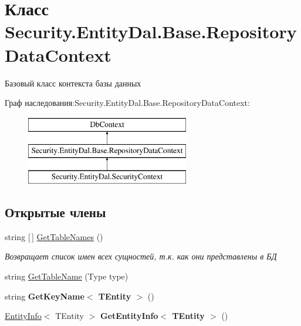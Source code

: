 \hypertarget{class_security_1_1_entity_dal_1_1_base_1_1_repository_data_context}{}\section{Класс Security.\+Entity\+Dal.\+Base.\+Repository\+Data\+Context}
\label{class_security_1_1_entity_dal_1_1_base_1_1_repository_data_context}


Базовый класс контекста базы данных  


Граф наследования\+:Security.\+Entity\+Dal.\+Base.\+Repository\+Data\+Context\+:\begin{figure}[H]
\begin{center}
\leavevmode
\includegraphics[height=3.000000cm]{d9/d5a/class_security_1_1_entity_dal_1_1_base_1_1_repository_data_context}
\end{center}
\end{figure}
\subsection*{Открытые члены}
\begin{DoxyCompactItemize}
\item 
string \mbox{[}$\,$\mbox{]} \hyperlink{class_security_1_1_entity_dal_1_1_base_1_1_repository_data_context_a969e07d6e4ba25b186f85f37481238f7}{Get\+Table\+Names} ()
\begin{DoxyCompactList}\small\item\em Возвращает список имен всех сущностей, т.\+к. как они представлены в БД \end{DoxyCompactList}\item 
string \hyperlink{class_security_1_1_entity_dal_1_1_base_1_1_repository_data_context_a53f442bd751680668b83cc07d95fd1d1}{Get\+Table\+Name} (Type type)
\item 
\mbox{\label{class_security_1_1_entity_dal_1_1_base_1_1_repository_data_context_ab6b0dcc0a5350196f0a42bdce91b62c0}} 
string {\bfseries Get\+Key\+Name$<$ T\+Entity $>$} ()
\item 
\mbox{\label{class_security_1_1_entity_dal_1_1_base_1_1_repository_data_context_a01f13400d6c0ff93a6a694602e84b6c3}} 
\hyperlink{class_security_1_1_entity_dal_1_1_infrastructure_1_1_entity_info}{Entity\+Info}$<$ T\+Entity $>$ {\bfseries Get\+Entity\+Info$<$ T\+Entity $>$} ()
\end{DoxyCompactItemize}
